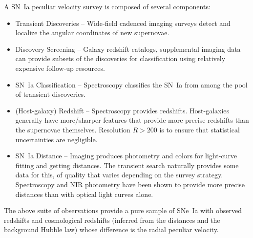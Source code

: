 \documentclass[11pt, oneside]{article}   	%
\begin{document}
A SN~Ia peculiar velocity survey is composed of several components:
\begin{itemize}
\item Transient Discoveries -- Wide-field cadenced imaging surveys detect and localize the angular coordinates of new supernovae.
\item Discovery Screening -- Galaxy redshift catalogs, supplemental imaging data can provide subsets of the discoveries for classification
using relatively expensive follow-up resources.
\item SN~Ia Classification -- Spectroscopy classifies the SN~Ia from among the pool of  transient discoveries. 
\item (Host-galaxy) Redshift -- Spectroscopy provides redshifts. 
Host-galaxies generally have more/sharper features that provide more precise redshifts than the supernovae themselves. Resolution $R>200$
is  to ensure that statistical uncertainties are negligible.
\item SN~Ia Distance -- Imaging produces photometry and colors for light-curve fitting and getting distances.  The transient search naturally provides some data
for this, of quality that varies depending on the survey strategy.
Spectroscopy and NIR photometry
have been shown to provide more precise distances than with optical light curves alone.
\end{itemize}
The above suite of observations provide a pure sample of SNe~Ia with observed redshifts and cosmological redshifts (inferred from the distances and
the background Hubble law)
whose difference is the radial peculiar velocity.
\end{document}
